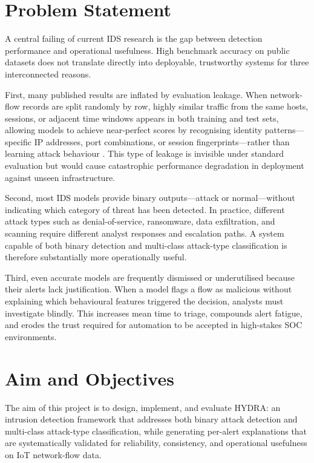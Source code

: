 \documentclass[12pt,a4paper]{report}
\begin{document}
\section{Problem Statement}
\label{sec:problem}

A central failing of current IDS research is the gap between detection performance and operational usefulness. High benchmark accuracy on public datasets does not translate directly into deployable, trustworthy systems for three interconnected reasons.

First, many published results are inflated by evaluation leakage. When network-flow records are split randomly by row, highly similar traffic from the same hosts, sessions, or adjacent time windows appears in both training and test sets, allowing models to achieve near-perfect scores by recognising identity patterns---specific IP addresses, port combinations, or session fingerprints---rather than learning attack behaviour \citep{turcotte2017}. This type of leakage is invisible under standard evaluation but would cause catastrophic performance degradation in deployment against unseen infrastructure.

Second, most IDS models provide binary outputs---attack or normal---without indicating which category of threat has been detected. In practice, different attack types such as denial-of-service, ransomware, data exfiltration, and scanning require different analyst responses and escalation paths. A system capable of both binary detection and multi-class attack-type classification is therefore substantially more operationally useful.

Third, even accurate models are frequently dismissed or underutilised because their alerts lack justification. When a model flags a flow as malicious without explaining which behavioural features triggered the decision, analysts must investigate blindly. This increases mean time to triage, compounds alert fatigue, and erodes the trust required for automation to be accepted in high-stakes SOC environments.

\section{Aim and Objectives}
\label{sec:aim}

The aim of this project is to design, implement, and evaluate HYDRA: an intrusion detection framework that addresses both binary attack detection and multi-class attack-type classification, while generating per-alert explanations that are systematically validated for reliability, consistency, and operational usefulness on IoT network-flow data.
\end{document}
